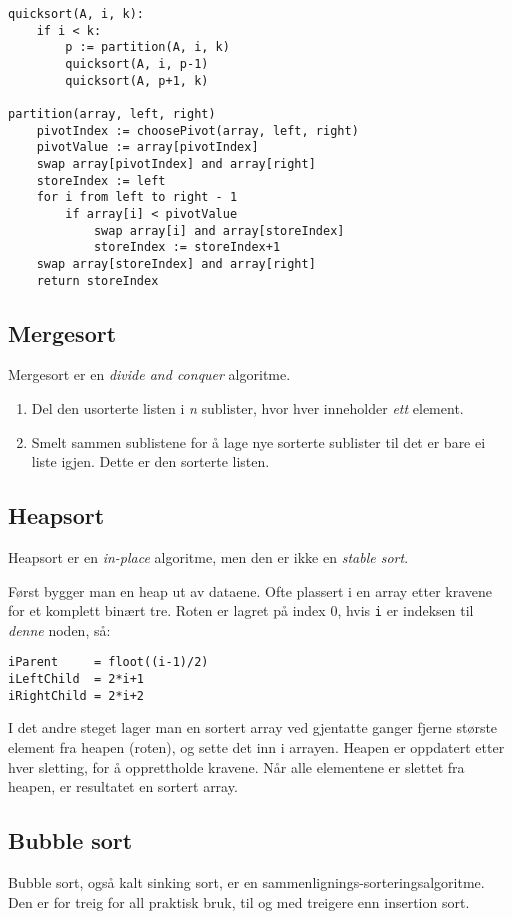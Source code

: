 \documentclass[11pt,a4paper]{article}
\theoremstyle{def}
\begin{document}
\begin{Verbatim}[frame=single]
quicksort(A, i, k):
    if i < k:
        p := partition(A, i, k)
        quicksort(A, i, p-1)
        quicksort(A, p+1, k)

partition(array, left, right)
    pivotIndex := choosePivot(array, left, right)
    pivotValue := array[pivotIndex]
    swap array[pivotIndex] and array[right]
    storeIndex := left
    for i from left to right - 1
        if array[i] < pivotValue
            swap array[i] and array[storeIndex]
            storeIndex := storeIndex+1
    swap array[storeIndex] and array[right]
    return storeIndex
\end{Verbatim}

\subsection{Mergesort}
Mergesort er en \textit{divide and conquer} algoritme.
\begin{enumerate}
\item
Del den usorterte listen i \textit{n} sublister, hvor hver inneholder \textit{ett} element.
\item
Smelt sammen sublistene for å lage nye sorterte sublister til det er bare ei liste igjen. Dette er den sorterte listen.
\end{enumerate}

\subsection{Heapsort}
Heapsort er en \textit{in-place} algoritme, men den er ikke en \textit{stable sort}.

Først bygger man en heap ut av dataene. Ofte plassert i en array etter kravene for et komplett binært tre. Roten er lagret på index 0, hvis \texttt{i} er indeksen til \textit{denne} noden, så:\vspace{-10pt}
\begin{Verbatim}
iParent     = floot((i-1)/2)
iLeftChild  = 2*i+1
iRightChild = 2*i+2
\end{Verbatim}

I det andre steget lager man en sortert array ved gjentatte ganger fjerne største element fra heapen (roten), og sette det inn i arrayen. Heapen er oppdatert etter hver sletting, for å opprettholde kravene. Når alle elementene er slettet fra heapen, er resultatet en sortert array.

\subsection{Bubble sort}
Bubble sort, også kalt sinking sort, er en sammenlignings-sorteringsalgoritme. Den er for treig for all praktisk bruk, til og med treigere enn insertion sort.
\end{document}
